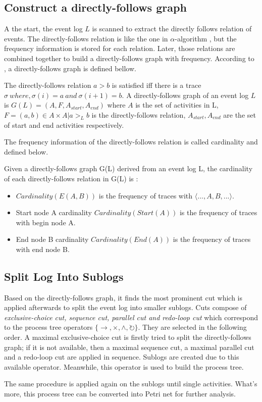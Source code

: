 \subsection{Construct a directly-follows graph}
A the start, the event log $L$ is scanned to extract the directly follows relation of events. The directly-follows relation is like the one in $\alpha$-algorithm \cite{van2004workflow, leemans2013discovering}, but the frequency information is stored for each relation. Later, those relations are combined together to build a directly-follows graph with frequency. According to \cite{van2016data, leemans2013discovering}, a directly-follows graph is defined bellow.
\begin{definition}
 The directly-follows relation $a > b$ is satisfied iff there is a trace $\sigma\ where, \sigma(i)=a \ and \ \sigma(i+1)=b$.
 A directly-follows graph of an event log $L$ is $G(L) = (A, F, A_{start}, A_{end}) $ where $A$ is the set of activities in L, $F={(a,b) \in A \times A | a >_L b} $ is the directly-follows relation, $A_{start}, A_{end}$ are the set of start and end activities respectively.
\end{definition}
The frequency information of the directly-follows relation is called cardinality and defined below.
\begin{definition}
Given a directly-follows graph G(L) derived from an event log L, the cardinality of each directly-follows relation in G(L) is :  
	\begin{itemize}
		\item $Cardinality(E(A,B))$ is the frequency of traces with $\langle ...,A,B,... \rangle$. 
		\item Start node A cardinality $Cardinality(Start(A))$ is the frequency of traces with begin node A.
		\item End node B cardinality $Cardinality(End(A))$ is the frequency of traces with end node B.
	\end{itemize}	
\end{definition}
\subsection{Split Log Into Sublogs}
Based on the directly-follows graph, it finds the most prominent cut which is applied afterwards to split the event log into smaller sublogs. Cuts compose of \emph{exclusive-choice cut, sequence cut, parallel cut and redo-loop cut} which correspond to the process tree operators $ \{\rightarrow, \times, \land, \circlearrowright \}$. They are selected in the following order. A maximal exclusive-choice cut is firstly tried to split the directly-follows graph; if it is not available, then a maximal sequence cut, a  maximal parallel cut and a redo-loop cut are applied in sequence. Sublogs are created due to this available operator. Meanwhile, this operator is used to build the process tree. 

The same procedure is applied again on the sublogs until single activities. What's more, this process tree can be converted into Petri net for further analysis. 